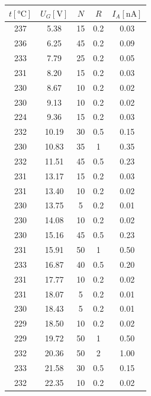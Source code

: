 \documentclass[titlepage]{article}
\begin{document}
\begin{table}[H]
    \begin{minipage}{.49 \textwidth}
      \centering
        \begin{tabular}{c||c|c|c|c}
            $t [\si{\celsius}]$ & $U_G [\si{\volt}]$ & $N$ & $R$ & $I_A [\si{\nano\ampere}]$ \\ \hline\hline
            237 & 5.38 & 15 & 0.2 & 0.03 \\ \hline
            236 & 6.25 & 45 & 0.2 & 0.09 \\ \hline
            233 & 7.79 & 25 & 0.2 & 0.05 \\ \hline
            231 & 8.20 & 15 & 0.2 & 0.03 \\ \hline
            230 & 8.67 & 10 & 0.2 & 0.02 \\ \hline
            230 & 9.13 & 10 & 0.2 & 0.02 \\ \hline
            224 & 9.36 & 15 & 0.2 & 0.03 \\ \hline
            232 & 10.19 & 30 & 0.5 & 0.15 \\ \hline
            230 & 10.83 & 35 & 1 & 0.35 \\ \hline
            232 & 11.51 & 45 & 0.5 & 0.23 \\ \hline
            231 & 13.17 & 15 & 0.2 & 0.03 \\ \hline
            231 & 13.40 & 10 & 0.2 & 0.02 \\ \hline
            230 & 13.75 & 5 & 0.2 & 0.01 \\ \hline
            230 & 14.08 & 10 & 0.2 & 0.02 \\ \hline
            230 & 15.16 & 45 & 0.5 & 0.23 \\ \hline
            231 & 15.91 & 50 & 1 & 0.50 \\ \hline
            233 & 16.87 & 40 & 0.5 & 0.20 \\ \hline
            231 & 17.77 & 10 & 0.2 & 0.02 \\ \hline
            231 & 18.07 & 5 & 0.2 & 0.01 \\ \hline
            230 & 18.43 & 5 & 0.2 & 0.01 \\ \hline
            229 & 18.50 & 10 & 0.2 & 0.02 \\ \hline
            229 & 19.72 & 50 & 1 & 0.50 \\ \hline
            232 & 20.36 & 50 & 2 & 1.00 \\ \hline
            233 & 21.58 & 30 & 0.5 & 0.15 \\ \hline
            232 & 22.35 & 10 & 0.2 & 0.02 \\ \hline

\end{tabular}
\end{minipage}
\end{table}
\end{document}
